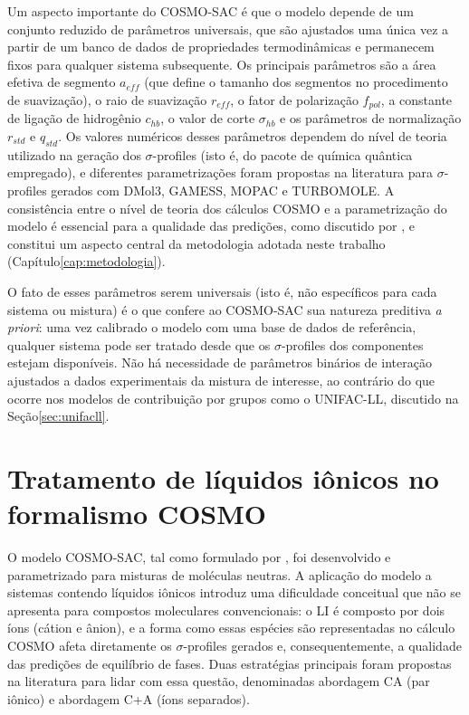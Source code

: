 Um aspecto importante do COSMO-SAC é que o modelo depende de um conjunto reduzido de parâmetros universais, que são ajustados uma única vez a partir de um banco de dados de propriedades termodinâmicas e permanecem fixos para qualquer sistema subsequente. Os principais parâmetros são a área efetiva de segmento $a_{eff}$ (que define o tamanho dos segmentos no procedimento de suavização), o raio de suavização $r_{eff}$, o fator de polarização $f_{pol}$, a constante de ligação de hidrogênio $c_{hb}$, o valor de corte $\sigma_{hb}$ e os parâmetros de normalização $r_{std}$ e $q_{std}$\cite{lin2002,gerber2010}. Os valores numéricos desses parâmetros dependem do nível de teoria utilizado na geração dos $\sigma$-profiles (isto é, do pacote de química quântica empregado), e diferentes parametrizações foram propostas na literatura para $\sigma$-profiles gerados com DMol3, GAMESS, MOPAC e TURBOMOLE\cite{gerber2010}. A consistência entre o nível de teoria dos cálculos COSMO e a parametrização do modelo é essencial para a qualidade das predições, como discutido por
, e constitui um aspecto central da metodologia adotada neste trabalho (Capítulo\ref{cap:metodologia}).

O fato de esses parâmetros serem universais (isto é, não específicos para cada sistema ou mistura) é o que confere ao COSMO-SAC sua natureza preditiva \textit{a priori}: uma vez calibrado o modelo com uma base de dados de referência, qualquer sistema pode ser tratado desde que os $\sigma$-profiles dos componentes estejam disponíveis. Não há necessidade de parâmetros binários de interação ajustados a dados experimentais da mistura de interesse, ao contrário do que ocorre nos modelos de contribuição por grupos como o UNIFAC-LL, discutido na Seção\ref{sec:unifacll}.

\section{Tratamento de líquidos iônicos no formalismo COSMO}
\label{sec:cosmo_li}

O modelo COSMO-SAC, tal como formulado por , foi desenvolvido e parametrizado para misturas de moléculas neutras. A aplicação do modelo a sistemas contendo líquidos iônicos introduz uma dificuldade conceitual que não se apresenta para compostos moleculares convencionais: o LI é composto por dois íons (cátion e ânion), e a forma como essas espécies são representadas no cálculo COSMO afeta diretamente os $\sigma$-profiles gerados e, consequentemente, a qualidade das predições de equilíbrio de fases. Duas estratégias principais foram propostas na literatura para lidar com essa questão, denominadas abordagem CA (par iônico) e abordagem C+A (íons separados)\cite{dominguez2014}.

